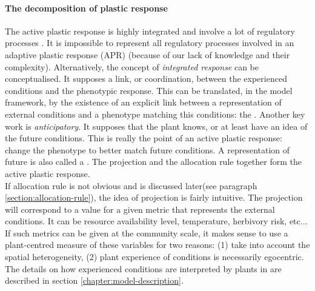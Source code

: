 \paragraph{The decomposition of plastic response}
The active plastic response is highly integrated \parencite{freschet_integrated_2015} and involve a lot of regulatory processes \parencite{nicotra_adaptive_2010}. It is impossible to represent all regulatory processes involved in an adaptive plastic response (APR) (because of our lack of knowledge and their complexity). Alternatively, the concept of \textit{integrated response} can be conceptualised. It supposes a link, or coordination, between the experienced conditions and the phenotypic response. This can be translated, in the model framework, by the existence of an explicit link between a representation of external conditions and a phenotype matching this conditions: the . Another key work is \textit{anticipatory}. It supposes that the plant knows, or at least have an idea of the future conditions. This is really the point of an active plastic response: change the phenotype to better match future conditions. A representation of future is also called a . The projection and the allocation rule together form the active plastic response.\\
If allocation rule is not obvious and is discussed later(see paragraph \ref{section:allocation-rule}), the idea of projection is fairly intuitive. The projection will correspond to a value for a given metric that represents the external conditions. It can be resource availability level, temperature, herbivory risk, etc... If such metrics can be given at the community scale, it makes sense to use a plant-centred measure of these variables for two reasons: (1) take into account the spatial heterogeneity, (2) plant experience of conditions is necessarily egocentric. The details on how experienced conditions are interpreted by plants in \model are described in section \ref{chapter:model-description}.

